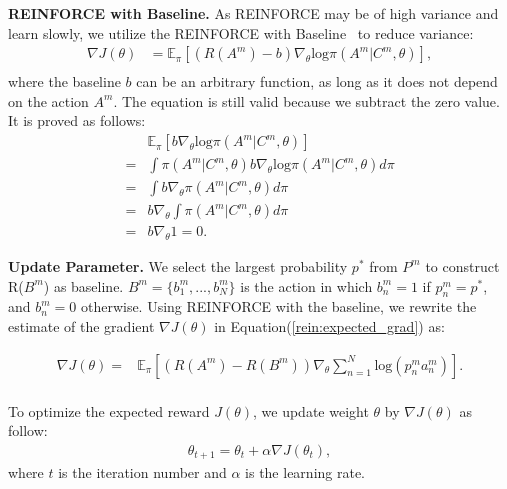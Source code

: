 \documentclass[journal]{IEEEtran}
\begin{document}
\textbf{REINFORCE with Baseline.}
As REINFORCE may be of high variance and learn slowly, we utilize the REINFORCE with Baseline~\cite{SuttonB98} to reduce variance:
\begin{equation}
\begin{aligned}
\nabla J(\theta)&=\mathbb{E}_\pi \left[(R(A^m)-b) \nabla_\theta\text{log} \pi(A^m|C^m,\theta)\right], \\
\end{aligned}
\label{rein:expected_grad_bx}
\end{equation}
where the baseline $b$ can be an arbitrary function, as long as it does not depend on the action $A^m$.
The equation is still valid because we subtract the zero value.
It is proved as follows:
\begin{equation}
\begin{aligned}
&\mathbb{E}_\pi [ b \nabla_\theta\text{log} \pi(A^m|C^m,\theta)]\\
=&\int \pi(A^m|C^m,\theta)  b \nabla_\theta \text{log}\pi(A^m|C^m,\theta)d \pi\\
=&\int   b \nabla_\theta \pi(A^m|C^m,\theta)d \pi\\
=&b \nabla_\theta \int  \pi(A^m|C^m,\theta)d \pi\\
=&b \nabla_\theta 1=0.
\end{aligned}
\end{equation}



\textbf{Update Parameter.} We select the largest probability $p^*$ from $P^m$ to construct R($B^m$) as baseline. $B^m=\{b_1^m, ..., b_N^m\}$ is the action in which $b_n^m=1$ if $p_n^m=p^*$, and $b_n^m=0$ otherwise.
Using REINFORCE with the baseline, we rewrite the estimate of the gradient $\nabla J(\theta)$ in Equation(\ref{rein:expected_grad}) as:

\begin{equation}
\begin{aligned}
\nabla J(\theta)=&\mathbb{E}_\pi [ (R(A^m)-R(B^m)) \nabla_\theta \sum_{n=1}^N \text{log}(p^m_n a^m_n)].\\
\end{aligned}
\label{rein:final_expected_grad}
\end{equation}

To optimize the expected reward $J(\theta)$, we update weight $\theta$ by $\nabla J(\theta)$  as follow:
\begin{equation}
\begin{aligned}
\theta_{t+1}=\theta_t + \alpha \nabla J(\theta_t),
\end{aligned}
\label{rein:update_param}
\end{equation}
where $t$ is the iteration number and $\alpha$ is the learning rate.
\end{document}
